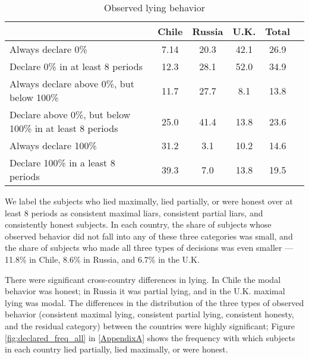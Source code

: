 \documentclass[12pt]{article}
\begin{document}
\begin{table}[h!]
\begin{center}
\begin{tabular}{lccccc}
\hline\hline
  & Chile & Russia & U.K. &  Total  \\
  \hline\hline
Always declare 0\% & 7.14 & 20.3 & 42.1 & 26.9 \\
Declare 0\% in at least 8 periods & 12.3 & 28.1 & 52.0 & 34.9   \\
  \hline\hline
Always declare above 0\%, but below 100\% & 11.7 & 27.7 & 8.1 & 13.8   \\
Declare above 0\%, but below 100\% in at least 8 periods & 25.0 & 41.4 & 13.8 & 23.6 \\
  \hline\hline
Always declare 100\% & 31.2 & 3.1 & 10.2 & 14.6 \\
Declare 100\% in a least 8 periods & 39.3 & 7.0 & 13.8 & 19.5 \\
                  \hline\hline
\end{tabular}
\end{center}
\caption{Observed lying behavior}\label{repertoire}

\end{table}

\par We label the subjects who lied maximally, lied partially, or were honest over at least 8 periods as consistent maximal liars, consistent partial liars, and consistently honest subjects. In each country, the share of subjects whose observed behavior did not fall into any of these three categories was small, and the share of subjects who made all three types of decisions was even smaller --- 11.8\% in Chile, 8.6\% in Russia, and 6.7\% in the U.K.

\par There were significant cross-country differences in lying. In Chile the modal behavior was honest; in Russia it was partial lying, and in the U.K. maximal lying was modal. The differences in the distribution of the three types of observed behavior (consistent maximal lying, consistent partial lying, consistent honesty, and the residual category) between the countries were highly significant\footnotemark{}; Figure \ref{fig:declared_freq_all} in \ref{AppendixA} shows the frequency with which subjects in each country lied partially, lied maximally, or were honest. 
 
\end{document}
